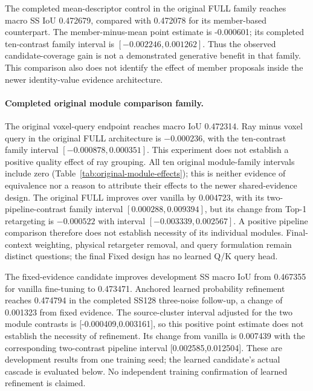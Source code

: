 \documentclass[10pt]{article}
\begin{document}
The completed mean-descriptor control in the original FULL family reaches
macro SS IoU 0.472679, compared with 0.472078 for its member-based counterpart.
The member-minus-mean point estimate is -0.000601; its completed ten-contrast
family interval is $[-0.002246,0.001262]$. Thus the observed candidate-coverage
gain is not a demonstrated generative benefit in that family. This comparison
also does not identify the effect of member proposals inside the newer
identity-value evidence architecture.

\paragraph{Completed original module comparison family.}
The original voxel-query endpoint reaches macro IoU 0.472314. Ray minus
voxel query in the original FULL architecture is $-0.000236$, with the
ten-contrast family interval $[-0.000878,0.000351]$. This experiment does not
establish a positive quality effect of ray grouping. All ten original
module-family intervals include zero (Table~\ref{tab:original-module-effects});
this is neither evidence of equivalence nor a reason to attribute their
effects to the newer shared-evidence design. The original FULL improves
over vanilla by 0.004723, with its two-pipeline-contrast family interval
$[0.000288,0.009394]$, but its change from Top-1 retargeting is $-0.000522$
with interval $[-0.003339,0.002567]$. A positive pipeline comparison therefore
does not establish necessity of its individual modules. Final-context
weighting, physical retargeter removal, and query formulation remain
distinct questions; the final Fixed design has no learned Q/K query head.


The fixed-evidence candidate improves development SS macro IoU from 0.467355
for vanilla fine-tuning to 0.473471. Anchored learned probability refinement
reaches 0.474794 in the completed SS128 three-noise follow-up, a change of
0.001323 from fixed evidence. The source-cluster interval adjusted for the
two module contrasts is [-0.000409,0.003161], so this positive point estimate
does not establish the necessity of refinement. Its change from vanilla is
0.007439 with the corresponding two-contrast pipeline interval
[0.002585,0.012504]. These are development results from one training seed;
the learned candidate's actual cascade is evaluated below. No independent
training confirmation of learned refinement is claimed.
\end{document}
